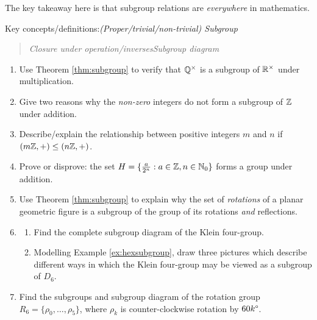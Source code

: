The key takeaway here is that subgroup relations are \emph{everywhere} in mathematics.


\goodbreak

\begin{exercises}
	Key concepts/definitions:\quad \emph{(Proper/trivial/non-trivial) Subgroup}
	\begin{quote}
		\emph{Closure under operation/inverses\quad Subgroup diagram}
	\end{quote}
	
	
	\begin{enumerate}
	  \item Use Theorem \ref{thm:subgroup} to verify that $\Q^\times$ is a subgroup of $\R^\times$ under multiplication.
	  
	  
		\item Give two reasons why the \emph{non-zero} integers do not form a subgroup of $\Z$ under addition.
	  	
	  	
	  \item Describe/explain the relationship between positive integers $m$ and $n$ if $(m\Z,+)\le (n\Z,+)$.
	
	
	  \item Prove or disprove: the set $H=\{\frac a{2^n}:a\in\Z,n\in\N_0\}$ forms a group under addition.
	    
	    
	  \item Use Theorem \ref{thm:subgroup} to explain why the set of \emph{rotations} of a planar geometric figure is a subgroup of the group of its rotations \emph{and} reflections.
	  
	 
	  \item\begin{enumerate}
	    \item Find the complete subgroup diagram of the Klein four-group.
	    
	  	\item Modelling Example \ref{ex:hexsubgroup}, draw three pictures which describe different ways in which the Klein four-group may be viewed as a subgroup of $D_6$.
	  \end{enumerate}
	  
	  
	  \item Find the subgroups and subgroup diagram of the rotation group $R_6=\{\rho_0,\ldots,\rho_5\}$, where $\rho_k$ is counter-clockwise rotation by $\ang{60k}$. 
	  

\end{enumerate}
\end{exercises}
